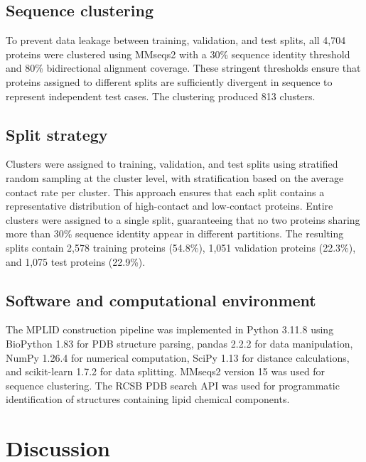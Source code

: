 \documentclass[unnumsec,webpdf,contemporary,large]{oup-authoring-template}
\begin{document}
\subsection{Sequence clustering}

To prevent data leakage between training, validation, and test splits, all 4,704 proteins were clustered using MMseqs2 \cite{steinegger2017} with a 30\% sequence identity threshold and 80\% bidirectional alignment coverage. These stringent thresholds ensure that proteins assigned to different splits are sufficiently divergent in sequence to represent independent test cases. The clustering produced 813 clusters.

\subsection{Split strategy}

Clusters were assigned to training, validation, and test splits using stratified random sampling at the cluster level, with stratification based on the average contact rate per cluster. This approach ensures that each split contains a representative distribution of high-contact and low-contact proteins. Entire clusters were assigned to a single split, guaranteeing that no two proteins sharing more than 30\% sequence identity appear in different partitions. The resulting splits contain 2,578 training proteins (54.8\%), 1,051 validation proteins (22.3\%), and 1,075 test proteins (22.9\%).

\subsection{Software and computational environment}

The MPLID construction pipeline was implemented in Python 3.11.8 using BioPython 1.83 \cite{cock2009} for PDB structure parsing, pandas 2.2.2 \cite{mckinney2010} for data manipulation, NumPy 1.26.4 for numerical computation, SciPy 1.13 for distance calculations, and scikit-learn 1.7.2 \cite{pedregosa2011} for data splitting. MMseqs2 version 15 \cite{steinegger2017} was used for sequence clustering. The RCSB PDB search API was used for programmatic identification of structures containing lipid chemical components.


\section{Discussion}
\end{document}
